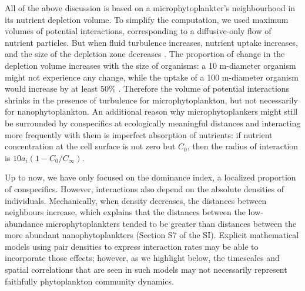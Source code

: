 \documentclass[12pt,english]{article}
\newcommand{\commentfred}[1]{{\bf \scriptsize\color{blue} [F: #1 ]}}
\begin{document}
All of the above discussion is based on a microphytoplankter's neighbourhood
in its nutrient depletion volume. To simplify the computation, we
used maximum volumes of potential interactions, corresponding to a
diffusive-only flow of nutrient particles. But when fluid turbulence
increases, nutrient uptake increases, and the size of the depletion
zone decreases \citep{karp-boss_nutrient_1996}. The proportion of
change in the depletion volume increases with the size of organisms:
a 10 \textmu m-diameter organism might not experience any change,
while the uptake of a 100 \textmu m-diameter organism would increase
by at least 50\% \citep{karp-boss_nutrient_1996}. Therefore the volume
of potential interactions shrinks in the presence of turbulence for
microphytoplankton, but not necessarily for nanophytoplankton. An additional reason why microphytoplankers might still
be surrounded by conspecifics at ecologically meaningful distances
and interacting more frequently with them is imperfect absorption of nutrients: if nutrient concentration at the cell surface is not zero but $C_0$, then the radius of interaction is $10 a_i(1 - C_0/C_{\infty})$. %

Up to now, we have only focused on the dominance index, a localized
proportion of conspecifics. However, interactions also depend on the
absolute densities of individuals. Mechanically, when density decreases,
the distances between neighbours increase, which explains that the
distances between the low-abundance microphytoplankters tended to
be greater than distances between the more abundant nanophytoplankters
(Section S7 of the SI). Explicit mathematical models using pair densities
to express interaction rates \citep[e.g.][]{law_population_2003,plank_spatial_2015}
may be able to incorporate those effects; however, as we highlight
below, the timescales and spatial correlations that are seen in such
models may not necessarily represent faithfully phytoplankton community
dynamics. %
\end{document}
